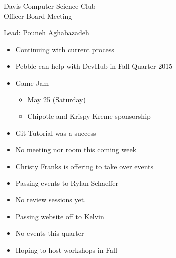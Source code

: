 \documentclass{article}
\begin{document}
\begin{Minutes}{Davis Computer Science Club\\Officer Board Meeting}

Lead: Pouneh Aghabazadeh

\begin{itemize}
	\item Continuing with current process
	\item Pebble can help with DevHub in Fall Quarter 2015
\end{itemize}



\begin{itemize}
	\item Game Jam
	\begin{itemize}
		\item May 25 (Saturday)
		\item Chipotle and Krispy Kreme sponsorship
	\end{itemize}
\end{itemize}


\begin{itemize}
	\item Git Tutorial was a success
	\item No meeting nor room this coming week
	\item Christy Franks is offering to take over events
\end{itemize}


\begin{itemize}
	\item Passing events to Rylan Schaeffer
\end{itemize}


\begin{itemize}
	\item No review sessions yet.
\end{itemize}


\begin{itemize}
	\item Passing website off to Kelvin
	\item No events this quarter
	\item Hoping to host workshops in Fall
\end{itemize}



\end{Minutes}
\end{document}
